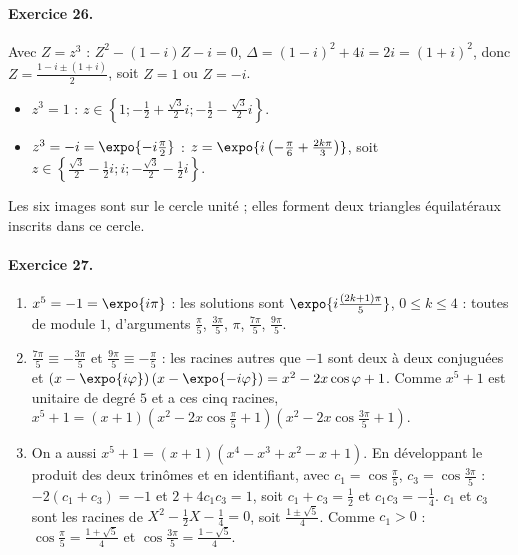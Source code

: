 \begin{corrige}
\paragraph{Exercice 26.}
Avec $Z = z^3$ : $Z^2 - (1 - i)Z - i = 0$, $\Delta = (1-i)^2 + 4i = 2i = (1 + i)^2$, donc $Z = \frac{1 - i \pm (1 + i)}{2}$, soit $Z = 1$ ou $Z = -i$.
\begin{itemize}
\item $z^3 = 1$ : $z \in \left\{1 ; -\frac{1}{2} + \frac{\sqrt{3}}{2}i ; -\frac{1}{2} - \frac{\sqrt{3}}{2}i\right\}$.
\item $z^3 = -i = \expo{-i\frac{\pi}{2}}$ : $z = \expo{i\left(-\frac{\pi}{6} + \frac{2k\pi}{3}\right)}$, soit $z \in \left\{\frac{\sqrt{3}}{2} - \frac{1}{2}i ; i ; -\frac{\sqrt{3}}{2} - \frac{1}{2}i\right\}$.
\end{itemize}
Les six images sont sur le cercle unit\'e ; elles forment deux triangles \'equilat\'eraux inscrits dans ce cercle.

\paragraph{Exercice 27.}
\begin{enumerate}
\item $x^5 = -1 = \expo{i\pi}$ : les solutions sont $\expo{i\frac{(2k+1)\pi}{5}}$, $0 \leq k \leq 4$ : toutes de module $1$, d'arguments
      $\frac{\pi}{5}$, $\frac{3\pi}{5}$, $\pi$, $\frac{7\pi}{5}$, $\frac{9\pi}{5}$.
\item $\frac{7\pi}{5} \equiv -\frac{3\pi}{5}$ et $\frac{9\pi}{5} \equiv -\frac{\pi}{5}$ : les racines autres que $-1$ sont deux \`a deux conjugu\'ees et
      $\left(x - \expo{i\varphi}\right)\left(x - \expo{-i\varphi}\right) = x^2 - 2x\cos\varphi + 1$. Comme $x^5 + 1$ est unitaire de degr\'e $5$ et a ces cinq racines,
      $x^5 + 1 = (x + 1)\left(x^2 - 2x\cos\frac{\pi}{5} + 1\right)\left(x^2 - 2x\cos\frac{3\pi}{5} + 1\right)$.
\item On a aussi $x^5 + 1 = (x+1)(x^4 - x^3 + x^2 - x + 1)$. En d\'eveloppant le produit des deux trin\^omes et en identifiant, avec
      $c_1 = \cos\frac{\pi}{5}$, $c_3 = \cos\frac{3\pi}{5}$ : $-2(c_1 + c_3) = -1$ et $2 + 4c_1c_3 = 1$, soit $c_1 + c_3 = \frac{1}{2}$ et $c_1c_3 = -\frac{1}{4}$.
      $c_1$ et $c_3$ sont les racines de $X^2 - \frac{1}{2}X - \frac{1}{4} = 0$, soit $\frac{1 \pm \sqrt{5}}{4}$. Comme $c_1 > 0$ :
      $\cos\frac{\pi}{5} = \boxed{\frac{1 + \sqrt{5}}{4}}$ et $\cos\frac{3\pi}{5} = \boxed{\frac{1 - \sqrt{5}}{4}}$.
\end{enumerate}


\end{corrige}
